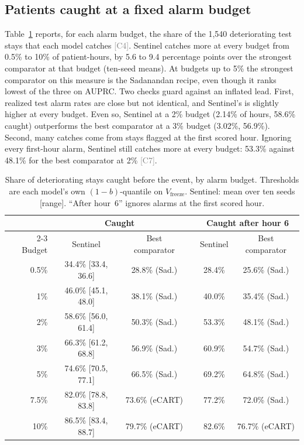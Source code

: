 \documentclass[11pt]{article}
\newcommand{\ev}[1]{\textcolor{gray}{\scriptsize[#1]}}   %
\begin{document}
\subsection{Patients caught at a fixed alarm budget}
Table~\ref{tab:sweep} reports, for each alarm budget, the share of the 1{,}540
deteriorating test stays that each model catches \ev{C4}. Sentinel catches more
at every budget from 0.5\% to 10\% of patient-hours, by 5.6 to 9.4 percentage
points over the strongest comparator at that budget (ten-seed means). At budgets
up to 5\% the strongest comparator on this measure is the Sadanandan recipe,
even though it ranks lowest of the three on AUPRC. Two checks guard against an
inflated lead. First, realized test alarm rates are close but not identical, and
Sentinel's is slightly higher at every budget. Even so, Sentinel at a 2\% budget
(2.14\% of hours, 58.6\% caught) outperforms the best comparator at a 3\% budget
(3.02\%, 56.9\%). Second, many catches come from stays flagged at the first
scored hour. Ignoring every first-hour alarm, Sentinel still catches more at
every budget: 53.3\% against 48.1\% for the best comparator at 2\% \ev{C7}.

\begin{table}[t]
\centering
\small
\caption{Share of deteriorating stays caught before the event, by alarm budget.
Thresholds are each model's own $(1-b)$-quantile on $V_{\text{freeze}}$.
Sentinel: mean over ten seeds [range]. ``After hour~6'' ignores alarms at the
first scored hour.}\label{tab:sweep}
\begin{tabular}{@{}rccccc@{}}
\toprule
& \multicolumn{2}{c}{Caught} & & \multicolumn{2}{c}{Caught after hour 6} \\
\cmidrule{2-3}\cmidrule{5-6}
Budget & Sentinel & Best comparator & & Sentinel & Best comparator \\
\midrule
0.5\% & 34.4\% [33.4, 36.6] & 28.8\% (Sad.) & & 28.4\% & 25.6\% (Sad.) \\
1\%   & 46.0\% [45.1, 48.0] & 38.1\% (Sad.) & & 40.0\% & 35.4\% (Sad.) \\
2\%   & 58.6\% [56.0, 61.4] & 50.3\% (Sad.) & & 53.3\% & 48.1\% (Sad.) \\
3\%   & 66.3\% [61.2, 68.8] & 56.9\% (Sad.) & & 60.9\% & 54.7\% (Sad.) \\
5\%   & 74.6\% [70.5, 77.1] & 66.5\% (Sad.) & & 69.2\% & 64.8\% (Sad.) \\
7.5\% & 82.0\% [78.8, 83.8] & 73.6\% (eCART) & & 77.2\% & 72.0\% (Sad.) \\
10\%  & 86.5\% [83.4, 88.7] & 79.7\% (eCART) & & 82.6\% & 76.7\% (eCART) \\
\bottomrule
\end{tabular}
\end{table}
\end{document}
